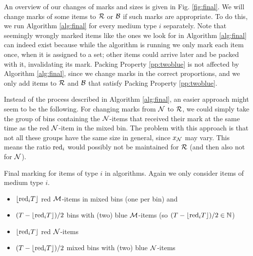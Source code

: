 An overview of our changes of marks and sizes
is given in Fig. \ref{fig:final}. 
We will change marks of some items to $\mathcal{R}$ or $\mathcal{B}$ if
such marks are appropriate. To do this, we run Algorithm \ref{alg:final}
for every medium type $i$ separately.
Note that seemingly wrongly marked items like the ones we look for in
Algorithm \ref{alg:final} can indeed exist because while the algorithm is
running we only mark
each item once, when it is assigned to a set; other items could arrive later
and be packed with it, invalidating its mark.
Packing Property \ref{pp:twoblue} is not affected by Algorithm \ref{alg:final},
since we change marks in the correct proportions, and we only add items to $\mathcal{R}$ and $\mathcal{B}$
that satisfy Packing Property \ref{pp:twoblue}. 

Instead of the process described in Algorithm \ref{alg:final}, an easier approach might seem to be
the following. For changing marks from $\mathcal{N}$ to $\mathcal{R}$, we could simply take the group of bins containing 
the $\mathcal{N}$-items that received their mark at the same time as the red $\mathcal{N}$-item in the mixed bin.
The problem with this approach is that not all these groups have the same size in general, since $x_{\mathcal{N}}$ may vary. This means the ratio $\mathrm{red}_i$ would possibly not
be maintained for $\mathcal{R}$ (and then also not for $\mathcal{N}$).


\begin{algorithm}[t]
\caption{\label{alg:final}
Final marking for items of type $i$ in {\EHarm} algorithms. Again we only
consider items of medium type $i$.}
\begin{algorithmic}[1]
\label{final:sort}
\For{$\M=\{\N,\B\}$}
	\begin{itemize}
		\item $\lfloor \mathrm{red}_i T \rfloor$ red $\mathcal{M}$-items in mixed bins (one per bin) and
		\item $(T - \lfloor \mathrm{red}_i   T \rfloor)/2$ bins with (two) blue $\mathcal{M}$-items (so $(T - \lfloor \mathrm{red}_i   T \rfloor)/2\in\mathbb N$)
	\end{itemize}
\EndFor
{}
	\begin{itemize}
		\item $\lfloor \mathrm{red}_i T \rfloor$ red $\mathcal{N}$-items 
		\item $(T - \lfloor \mathrm{red}_i   T \rfloor)/2$ mixed bins with (two) blue $\mathcal{N}$-items
	\end{itemize}
\end{algorithmic}
\end{algorithm}


